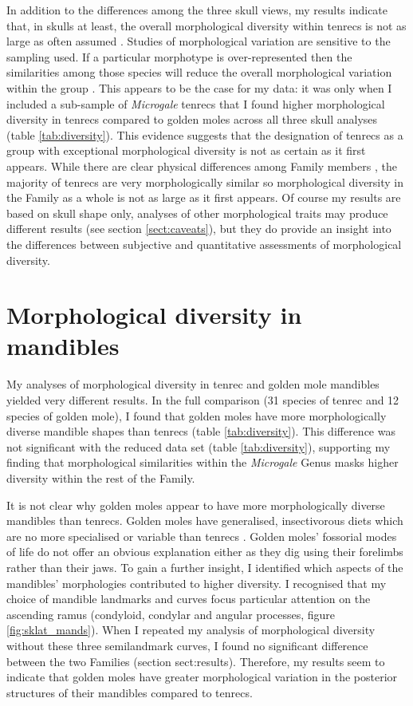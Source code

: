 	
	In addition to the differences among the three skull views, my results indicate that, in skulls at least, the overall morphological diversity within tenrecs is not as large as often assumed \citep[e.g.][]{Eisenberg1969, Olson2013}. Studies of morphological variation are sensitive to the sampling used. If a particular morphotype is over-represented then the similarities among those species will reduce the overall morphological variation within the group \citep{Foote1991}. This appears to be the case for my data: it was only when I included a sub-sample of \textit{Microgale} tenrecs that I found higher morphological diversity in tenrecs compared to golden moles across all three skull analyses (table \ref{tab:diversity}). This evidence suggests that the designation of tenrecs as a group with exceptional morphological diversity is not as certain as it first appears. While there are clear physical differences among Family members \citep{Olson2013, Eisenberg1969}, the majority of tenrecs are very morphologically similar \citep{Jenkins2003} so morphological diversity in the Family as a whole is not as large as it first appears. Of course my results are based on skull shape only, analyses of other morphological traits may produce different results (see section \ref{sect:caveats}), but they do provide an insight into the differences between subjective and quantitative assessments of morphological diversity.  

\section{Morphological diversity in mandibles}
	My analyses of morphological diversity in tenrec and golden mole mandibles yielded very different results. In the full comparison (31 species of tenrec and 12 species of golden mole), I found that golden moles have more morphologically diverse mandible shapes than tenrecs (table \ref{tab:diversity}). This difference was not significant with the reduced data set (table \ref{tab:diversity}), supporting my finding that morphological similarities within the \textit{Microgale} Genus masks higher diversity within the rest of the Family.
	
	It is not clear why golden moles appear to have more morphologically diverse mandibles than tenrecs. Golden moles have generalised, insectivorous diets \citep{Bronner1995} which are no more specialised or variable than tenrecs \citep{Soarimalala2011}. Golden moles' fossorial modes of life do not offer an obvious explanation either as they dig using their forelimbs rather than their jaws.
	To gain a further insight, I identified which aspects of the mandibles' morphologies contributed to higher diversity. I recognised that 
	my choice of mandible landmarks and curves focus particular attention on the ascending ramus (condyloid, condylar and angular processes, figure \ref{fig:sklat_mands}). When I repeated my analysis of morphological diversity without these three semilandmark curves, I found no significant difference between the two Families (section {sect:results}). Therefore, my results seem to indicate that golden moles have greater morphological variation in the posterior structures of their mandibles compared to tenrecs. 
	
